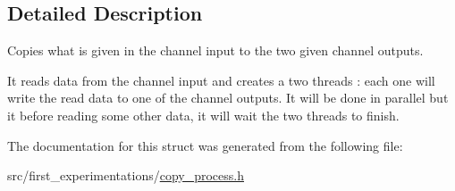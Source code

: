 \subsection{Detailed Description}
Copies what is given in the channel input to the two given channel outputs. 

It reads data from the channel input and creates a two threads \-: each one will write the read data to one of the channel outputs. It will be done in parallel but it before reading some other data, it will wait the two threads to finish. 

The documentation for this struct was generated from the following file\-:\begin{DoxyCompactItemize}
\item 
src/first\-\_\-experimentations/\hyperlink{copy__process_8h}{copy\-\_\-process.\-h}\end{DoxyCompactItemize}
